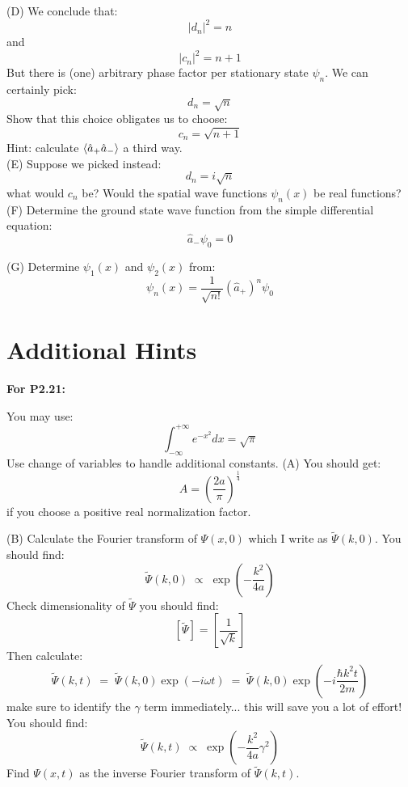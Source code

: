 \documentclass[12pt]{article}
\begin{document}
\newpage


\noindent
(D) We conclude that:
$$|d_n|^2 = n$$
and
$$|c_n|^2 = n+1$$
But there is (one) arbitrary phase factor per stationary state $\psi_n$.  We can certainly pick:
$$d_n = \sqrt{n}$$
Show that this choice obligates us to choose:
$$c_n = \sqrt{n+1}$$
Hint: calculate $\braket{\hat{a}_+\hat{a}_-}$ a third way.\\[5pt]

\noindent
(E) Suppose we picked instead:
$$d_n = i\sqrt{n}$$
what would $c_n$ be?  Would the spatial wave functions $\psi_n(x)$ be real functions?\\[5pt]

\noindent
(F) Determine the ground state wave function from the simple differential equation:
$$\hat{a}_- \psi_0 = 0$$

\noindent
(G) Determine $\psi_1(x)$ and $\psi_2(x)$ from:
$$\psi_n(x) = \frac{1}{\sqrt{n!}}(\hat{a}_+)^n \psi_0$$

\newpage

\section*{Additional Hints}

{\bf For P2.21:}

\noindent
You may use:
$$\int_{-\infty}^{+\infty} e^{-x^2} dx = \sqrt{\pi}$$
Use change of variables to handle additional constants.
\noindent
(A) You should get:
$$A=\left( \frac{2a}{\pi}\right)^{\frac{1}{4}}$$
if you choose a positive real normalization factor.

\noindent
(B) Calculate the Fourier transform of $\Psi(x,0)$ which I write as $\widetilde{\Psi}(k,0)$.  You should find:
$$\widetilde{\Psi}(k,0) \; \propto \; \exp\left( - \frac{k^2}{4a}\right)$$
Check dimensionality of $\widetilde{\Psi}$ you should find:
$$[\widetilde{\Psi}] = \left[\frac{1}{\sqrt{k}}\right]$$
Then calculate:
$$\widetilde{\Psi}(k,t) \; = \; \widetilde{\Psi}(k,0) \exp(-i\omega t) \; = \; \widetilde{\Psi}(k,0) \exp\left(-i\frac{\hbar k^2 t}{2m}\right)$$
make sure to identify the $\gamma$ term immediately... this will save you a lot of effort!  You should find:
$$\widetilde{\Psi}(k,t) \; \propto \; \exp\left( - \frac{k^2}{4a}\gamma^2\right)$$
Find $\Psi(x,t)$ as the inverse Fourier transform of $\widetilde{\Psi}(k,t)$.
\end{document}
